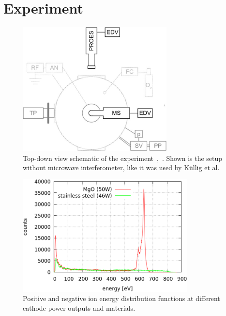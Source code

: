 \chapter{Experiment}\label{sec:twod_setup}
%
		\begin{figure}[b!]
			\centering
			\includegraphics[width=0.7\textwidth]{figures/chamber_exp.pdf}
			\caption[Experiment schematic of cylindrical symmetric ccrf discharge]{%
				Top-down view schematic of the experiment~\cite{Scheuer15},~\cite{Kullig12}. Shown is the setup %
				without microwave interferometer, like it was used by Küllig et al.}\label{fig:discharge_chamber}
		\end{figure}
%		
		\begin{figure}[!t]
			\centering
    		\includegraphics[width=0.8\textwidth]{figures/niondist_material.png}
            \caption[Experimental negative and positive ion EDF for differen materials]{%
                Positive and negative ion energy distribution %
                functions at different cathode power outputs and %
                materials.~\cite{Scheuer15}}
        \label{fig:expresults}
    \end{figure}
